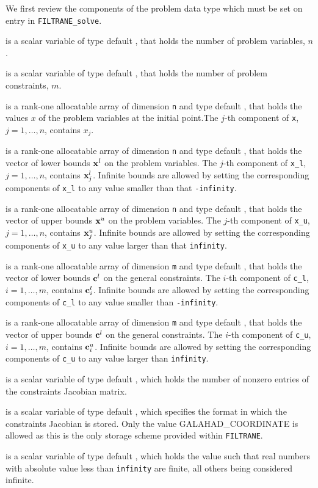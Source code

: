 \documentclass{galahad}
\newcommand{\packagename}{FILTRANE}
\newcommand{\sym}{\sf\small}
\newcommand{\filtrane}{{\tt \packagename}}
\begin{document}
\noindent
We first review the components of the problem data type which must be set on
entry in {\tt \packagename\_solve}.
\begin{description}
 is a scalar variable of type default \integer,
 that holds the number of problem variables, $n$.

 is a scalar variable of type default \integer,
 that holds the number of problem constraints, $m$.

 is a rank-one allocatable array of dimension {\tt n} and type
default \realdp, that holds the values $x$ of the problem variables at the
initial point.The $j$-th component of {\tt x}, $j = 1,  \ldots , n$, contains
$x_{j}$.

 is a rank-one allocatable array of dimension {\tt n} and type
default \realdp, that holds
the vector of lower bounds ${\mathbf{x}}^l$ on the problem variables.
The $j$-th component of {\tt x\_l}, $j = 1, \ldots , n$,
contains ${\mathbf{x}}^l_{j}$.
Infinite bounds are allowed by setting the corresponding
components of {\tt x\_l} to any value smaller than that {\tt -infinity}.

 is a rank-one allocatable array of dimension {\tt n} and type
default \realdp, that holds
the vector of upper bounds ${\mathbf{x}}^u$ on the problem variables.
The $j$-th component of {\tt x\_u}, $j = 1, \ldots , n$,
contains ${\mathbf{x}}^u_{j}$.
Infinite bounds are allowed by setting the corresponding
components of {\tt x\_u} to any value larger than that {\tt infinity}.

 is a rank-one allocatable array of dimension {\tt m} and type
default \realdp, that holds the vector of lower bounds ${\mathbf{c}}^{l}$
on the general constraints. The $i$-th component of
{\tt c\_l}, $i = 1, \ldots , m$, contains ${\mathbf{c}}_{i}^{l}$.
Infinite bounds are allowed by setting the corresponding
components of {\tt c\_l} to any value smaller than {\tt -infinity}.

 is a rank-one allocatable array of dimension {\tt m} and type
default \realdp, that holds the vector of upper bounds ${\mathbf{c}}^{l}$
on the general constraints. The $i$-th component of
{\tt c\_u}, $i = 1, \ldots , m$, contains ${\mathbf{c}}_{i}^{u}$.
Infinite bounds are allowed by setting the corresponding
components of {\tt c\_u} to any value larger than {\tt infinity}.

 is a scalar variable of type default \integer,
which holds the number of nonzero entries of the constraints Jacobian matrix.

 is a scalar variable of type default \integer,
which specifies the format in which the constraints Jacobian is stored.
Only the value {\sym GALAHAD\_COORDINATE} is allowed as this is the only
storage scheme provided within \filtrane.

 is a scalar variable of type default \realdp, which
holds the value such that real numbers with absolute value less than
{\tt infinity} are finite, all others being considered infinite.
\end{description}
\end{document}
